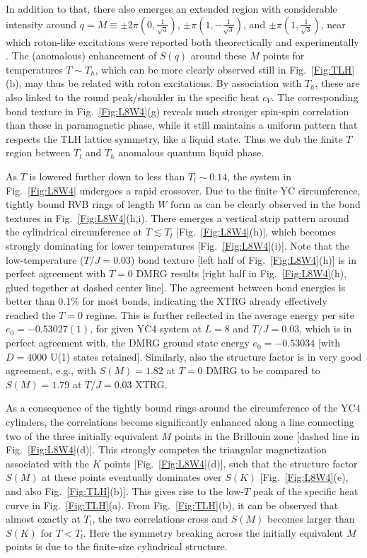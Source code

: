 \documentclass[aps,prx,twocolumn,showpacs,psfig,superscriptaddress,longbibliography]{revtex4-1}
\newcommand{\Fig}[1]{Fig.~\ref{#1}}
\newcommand{\aw}[1]{{\color[rgb]{.9,.5,.2}{#1}}}
\begin{document}
 {In addition to that, there also emerges an extended region with considerable intensity around $q=M \equiv \pm 2\pi (0, \frac{1}{\sqrt{3}})$, $\pm \pi (1, -\frac{1}{\sqrt{3}})$, and $\pm \pi (1, \frac{1}{\sqrt{3}})$, near which roton-like excitations were reported both theorectically \cite{Zheng-2005,Zheng-2006,Zheng2006PRL,Alicea06} and experimentally \cite{Ito2017}. The (anomalous) %
enhancement of $S(q)$ around these $M$ points
for temperatures $T\sim T_h$, which can be more clearly %
observed still in Fig.~\ref{Fig:TLH}(b), may thus %
be related with roton excitations. By association with $T_h$, these
are also linked to %
the round peak/shoulder in the specific heat  $c_V$. The corresponding bond texture in Fig.~\ref{Fig:L8W4}(g) reveals much stronger spin-spin correlation than those in paramagnetic phase, while it still maintains a uniform pattern that respects the TLH lattice symmetry, like a liquid state. Thus we dub the finite $T$ region between $T_l$ and $T_h$ anomalous quantum liquid phase.}

 {As $T$ is lowered further down to less than $T_l\sim0.14$,
the system in \Fig{Fig:L8W4} undergoes 
a rapid crossover.
Due to the finite YC circumference, tightly bound RVB rings of length $W$ form
%
as can be clearly observed %
in the bond textures in \Fig{Fig:L8W4}(h,i).
There emerges a vertical strip pattern around the cylindrical circumference at $T\lesssim T_l$ [Fig.~\ref{Fig:L8W4}(h)], which becomes strongly dominating for lower temperatures [Fig.~\ref{Fig:L8W4}(i)]. Note that the low-temperature ($T/J=0.03$) bond texture [left half of Fig.~\ref{Fig:L8W4}(h)]
is in perfect agreement with $T=0$ DMRG results [right half in Fig.~\ref{Fig:L8W4}(h), glued together at dashed center line]. The agreement between bond energies is better than 0.1\% for most bonds, indicating the XTRG already effectively reached the $T=0$ regime.
This is further reflected in the average energy per site $e_0=-0.53027(1)$, for given
YC4 system at $L=8$ and $T/J=0.03$, which is in perfect agreement with, \aw{i.e. just above} the DMRG ground state energy $e_0=-0.53034$ [with $D=4000$ U(1) states retained].
Similarly, also the structure factor is in very good agreement, e.g., with $S(M)= 1.82$ at $T=0$ DMRG to be compared to $S(M)=1.79$ at $T/J=0.03$ XTRG.}

 {As a consequence of the tightly bound rings around the
circumference of the YC4 cylinders, the correlations
become significantly enhanced along a line connecting %
two of the three initially equivalent $M$ points in the  {Brillouin zone}
[dashed line in \Fig{Fig:L8W4}(d)].
This strongly competes the triangular magnetization associated with the $K$ points
[Fig.~\ref{Fig:L8W4}(d)], such that the structure factor $S(M)$ at these points %
eventually dominates over $S(K)$ [\Fig{Fig:L8W4}(e), and also \Fig{Fig:TLH}(b)]. 
This gives rise to the low-$T$ peak of the specific heat curve in Fig.~\ref{Fig:TLH}(a). 
From Fig.~\ref{Fig:TLH}(b), it can be observed that almost exactly at $T_l$, 
the two correlations cross and $S(M)$ becomes larger than $S(K)$ for $T<T_l$.
Here the symmetry breaking across the initially equivalent $M$ points
is due to the finite-size cylindrical structure.
}
\end{document}
